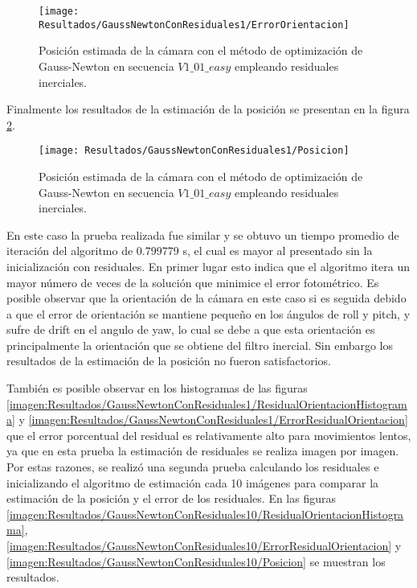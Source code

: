 \begin{figure}[H]
	\centering
	\texttt{[image: Resultados/GaussNewtonConResiduales1/ErrorOrientacion]}
	\caption{Posición estimada de la cámara con el método de optimización de Gauss-Newton en secuencia $V1\_ 01\_ easy$ empleando residuales inerciales. }
	\label{imagen:Resultados/GaussNewtonConResiduales1/ErrorOrientacion}
\end{figure}

Finalmente los resultados de la estimación de la posición se presentan en la figura \ref{imagen:Resultados/GaussNewtonConResiduales1/Posicion}.

\begin{figure}[H]
	\centering
	\texttt{[image: Resultados/GaussNewtonConResiduales1/Posicion]}
	\caption{Posición estimada de la cámara con el método de optimización de Gauss-Newton en secuencia $V1\_ 01\_ easy$ empleando residuales inerciales. }
	\label{imagen:Resultados/GaussNewtonConResiduales1/Posicion}
\end{figure}

En este caso la prueba realizada fue similar y se obtuvo un tiempo promedio de iteración del algoritmo de 0.799779 s, el cual es mayor al presentado sin la inicialización con residuales. En primer lugar esto indica que el algoritmo itera un mayor número de veces de la solución que minimice el error fotométrico. Es posible observar que la orientación de la cámara en este caso si es seguida debido a que el error de orientación se mantiene pequeño en los ángulos de roll y pitch, y sufre de drift en el angulo de yaw, lo cual se debe a que esta orientación es principalmente la orientación que se obtiene del filtro inercial. Sin embargo los resultados de la estimación de la posición no fueron satisfactorios.

También es posible observar en los histogramas de las figuras \ref{imagen:Resultados/GaussNewtonConResiduales1/ResidualOrientacionHistograma} y \ref{imagen:Resultados/GaussNewtonConResiduales1/ErrorResidualOrientacion} que el error porcentual del residual es relativamente alto para movimientos lentos, ya que en esta prueba la estimación de residuales se realiza imagen por imagen. Por estas razones, se realizó una segunda prueba calculando los residuales e inicializando el algoritmo de estimación cada 10 imágenes para comparar la estimación de la posición y el error de los residuales. En las figuras  \ref{imagen:Resultados/GaussNewtonConResiduales10/ResidualOrientacionHistograma}, \ref{imagen:Resultados/GaussNewtonConResiduales10/ErrorResidualOrientacion} y \ref{imagen:Resultados/GaussNewtonConResiduales10/Posicion} se muestran los resultados.

